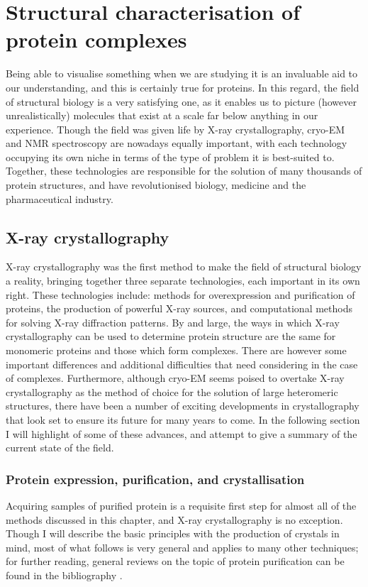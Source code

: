 \documentclass[a4paper,11pt,twoside,openright]{scrbook}
\begin{document}
\section{Structural characterisation of protein complexes}
Being able to visualise something when we are studying it is an invaluable aid to our understanding, and this is certainly true for proteins. In this regard, the field of structural biology is a very satisfying one, as it enables us to picture (however unrealistically) molecules that exist at a scale far below anything in our experience. Though the field was given life by X-ray crystallography, cryo-EM and NMR spectroscopy are nowadays equally important, with each technology occupying its own niche in terms of the type of problem it is best-suited to. Together, these technologies are responsible for the solution of many thousands of protein structures, and have revolutionised biology, medicine and the pharmaceutical industry.

\subsection{X-ray crystallography}
X-ray crystallography was the first method to make the field of structural biology a reality, bringing together three separate technologies, each important in its own right. These technologies include: methods for overexpression and purification of proteins, the production of powerful X-ray sources, and computational methods for solving X-ray diffraction patterns. By and large, the ways in which X-ray crystallography can be used to determine protein structure are the same for monomeric proteins and those which form complexes. There are however some important differences and additional difficulties that need considering in the case of complexes. Furthermore, although cryo-EM seems poised to overtake X-ray crystallography as the method of choice for the solution of large heteromeric structures, there have been a number of exciting developments in crystallography that look set to ensure its future for many years to come. In the following section I will highlight of some of these advances, and attempt to give a summary of the current state of the field.

\subsubsection{Protein expression, purification, and crystallisation}
Acquiring samples of purified protein is a requisite first step for almost all of the methods discussed in this chapter, and X-ray crystallography is no exception. Though I will describe the basic principles with the production of crystals in mind, most of what follows is very general and applies to many other techniques; for further reading, general reviews on the topic of protein purification can be found in the bibliography \cite{Link2005,Graslund2008,LaCava2016}.
\end{document}

